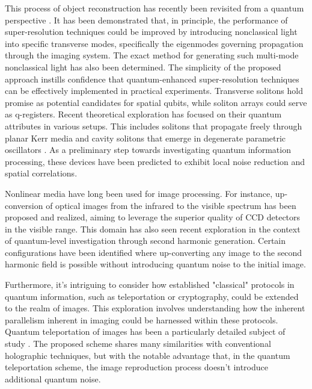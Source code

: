 \documentclass{article}
\begin{document}
This process of object reconstruction has recently been revisited from a quantum perspective \cite{PhysRevLett.85.3789}. It has been demonstrated that, in principle, the performance of super-resolution techniques could be improved by introducing nonclassical light into specific transverse modes, specifically the eigenmodes governing propagation through the imaging system. The exact method for generating such multi-mode nonclassical light has also been determined. The simplicity of the proposed approach instills confidence that quantum-enhanced super-resolution techniques can be effectively implemented in practical experiments.
Transverse solitons hold promise as potential candidates for spatial qubits, while soliton arrays could serve as q-registers. Recent theoretical exploration has focused on their quantum attributes in various setups. This includes solitons that propagate freely through planar Kerr media \cite{EricLantz_2004} and cavity solitons that emerge in degenerate parametric oscillators \cite{Oppo2007}. As a preliminary step towards investigating quantum information processing, these devices have been predicted to exhibit local noise reduction and spatial correlations.

Nonlinear media have long been used for image processing. For instance, up-conversion of optical images from the infrared to the visible spectrum has been proposed and realized, aiming to leverage the superior quality of CCD detectors in the visible range. This domain has also seen recent exploration in the context of quantum-level investigation through second harmonic generation. Certain configurations have been identified where up-converting any image to the second harmonic field is possible without introducing quantum noise to the initial image.

Furthermore, it's intriguing to consider how established "classical" protocols in quantum information, such as teleportation or cryptography, could be extended to the realm of images. This exploration involves understanding how the inherent parallelism inherent in imaging could be harnessed within these protocols. Quantum teleportation of images has been a particularly detailed subject of study \cite{IvanVSokolov_2001}. The proposed scheme shares many similarities with conventional holographic techniques, but with the notable advantage that, in the quantum teleportation scheme, the image reproduction process doesn't introduce additional quantum noise.
\end{document}
